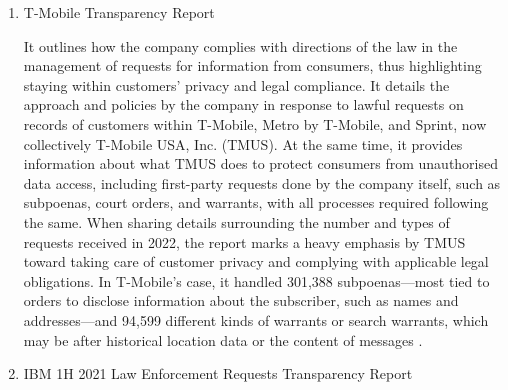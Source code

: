 \begin{enumerate}
\item  T-Mobile Transparency Report

It outlines how the company complies with directions of the law in the management of requests for information from consumers, thus highlighting staying within customers' privacy and legal compliance. It details the approach and policies by the company in response to lawful requests on records of customers within T-Mobile, Metro by T-Mobile, and Sprint, now collectively T-Mobile USA, Inc. (TMUS). At the same time, it provides information about what TMUS does to protect consumers from unauthorised data access, including first-party requests done by the company itself, such as subpoenas, court orders, and warrants, with all processes required following the same. When sharing details surrounding the number and types of requests received in 2022, the report marks a heavy emphasis by TMUS toward taking care of customer privacy and complying with applicable legal obligations. In T-Mobile’s case, it handled 301,388 subpoenas—most tied to orders to disclose information about the subscriber, such as names and addresses—and 94,599 different kinds of warrants or search warrants, which may be after historical location data or the content of messages \cite{TMobile2022TransparencyReport}.

\item IBM 1H 2021 Law Enforcement Requests Transparency Report
 

\end{enumerate}
